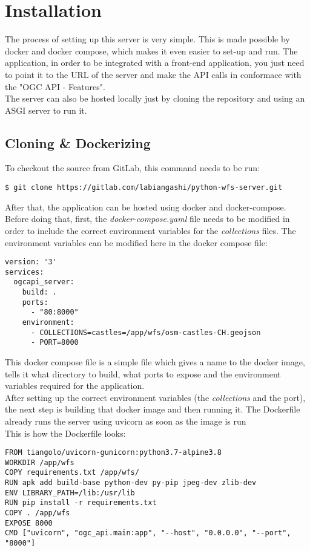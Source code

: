 \chapter{Installation}
The process of setting up this server is very simple. This is made possible by docker and docker compose, which makes it even easier to set-up and run. The application, in order to be integrated with a front-end application, you just need to point it to the URL of the server and make the API calls in conformace with the "OGC API - Features". \\
The server can also be hosted locally just by cloning the repository and using an ASGI server to run it.\\
\section{Cloning \& Dockerizing}
To checkout the source from GitLab, this command needs to be run:
\begin{verbatim}
$ git clone https://gitlab.com/labiangashi/python-wfs-server.git
\end{verbatim}
After that, the application can be hosted using docker and docker-compose. Before doing that, first, the \textit{docker-compose.yaml} file needs to be modified in order to include the correct environment variables for the \textit{collections} files. The environment variables can be modified here in the docker compose file: 
\begin{verbatim}
version: '3'
services:
  ogcapi_server:
    build: .
    ports:
      - "80:8000"
    environment:
      - COLLECTIONS=castles=/app/wfs/osm-castles-CH.geojson
      - PORT=8000
\end{verbatim}
This docker compose file is a simple file which gives a name to the docker image, tells it what directory to build, what ports to expose and the environment variables required for the application.\\
\newline
After setting up the correct environment variables (the \textit{collections} and the port), the next step is building that docker image and then running it.
The Dockerfile already runs the server using uvicorn as soon as the image is run\\
This is how the Dockerfile looks:
\begin{verbatim}
FROM tiangolo/uvicorn-gunicorn:python3.7-alpine3.8
WORKDIR /app/wfs
COPY requirements.txt /app/wfs/
RUN apk add build-base python-dev py-pip jpeg-dev zlib-dev
ENV LIBRARY_PATH=/lib:/usr/lib
RUN pip install -r requirements.txt
COPY . /app/wfs
EXPOSE 8000
CMD ["uvicorn", "ogc_api.main:app", "--host", "0.0.0.0", "--port", "8000"]
\end{verbatim}
